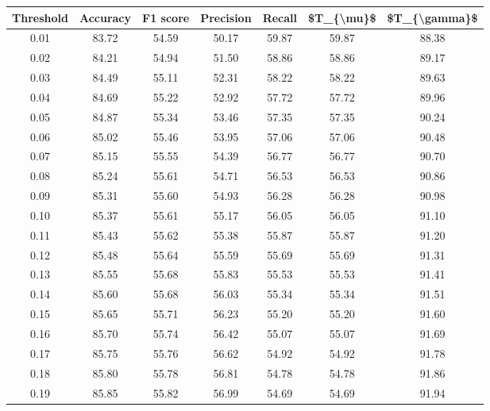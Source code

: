 \begin{tabular}{|c|c|c|c|c|c|c|}
\hline
 Threshold &  Accuracy &  F1 score &  Precision &  Recall &  \$T\_\{\textbackslash mu\}\$ &  \$T\_\{\textbackslash gamma\}\$ \\
\hline
      0.01 &     83.72 &     54.59 &      50.17 &   59.87 &      59.87 &         88.38 \\
      0.02 &     84.21 &     54.94 &      51.50 &   58.86 &      58.86 &         89.17 \\
      0.03 &     84.49 &     55.11 &      52.31 &   58.22 &      58.22 &         89.63 \\
      0.04 &     84.69 &     55.22 &      52.92 &   57.72 &      57.72 &         89.96 \\
      0.05 &     84.87 &     55.34 &      53.46 &   57.35 &      57.35 &         90.24 \\
      0.06 &     85.02 &     55.46 &      53.95 &   57.06 &      57.06 &         90.48 \\
      0.07 &     85.15 &     55.55 &      54.39 &   56.77 &      56.77 &         90.70 \\
      0.08 &     85.24 &     55.61 &      54.71 &   56.53 &      56.53 &         90.86 \\
      0.09 &     85.31 &     55.60 &      54.93 &   56.28 &      56.28 &         90.98 \\
      0.10 &     85.37 &     55.61 &      55.17 &   56.05 &      56.05 &         91.10 \\
      0.11 &     85.43 &     55.62 &      55.38 &   55.87 &      55.87 &         91.20 \\
      0.12 &     85.48 &     55.64 &      55.59 &   55.69 &      55.69 &         91.31 \\
      0.13 &     85.55 &     55.68 &      55.83 &   55.53 &      55.53 &         91.41 \\
      0.14 &     85.60 &     55.68 &      56.03 &   55.34 &      55.34 &         91.51 \\
      0.15 &     85.65 &     55.71 &      56.23 &   55.20 &      55.20 &         91.60 \\
      0.16 &     85.70 &     55.74 &      56.42 &   55.07 &      55.07 &         91.69 \\
      0.17 &     85.75 &     55.76 &      56.62 &   54.92 &      54.92 &         91.78 \\
      0.18 &     85.80 &     55.78 &      56.81 &   54.78 &      54.78 &         91.86 \\
      0.19 &     85.85 &     55.82 &      56.99 &   54.69 &      54.69 &         91.94 \\

\end{tabular}
